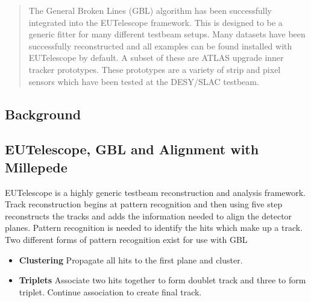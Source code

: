 \documentclass[a0,portrait]{a0poster}
\begin{document}
\vspace{1cm} %


\begin{multicols}{2} %


\begin{tcolorbox}
\color{Navy} %

\begin{abstract}
The General Broken Lines (GBL) algorithm has been successfully integrated into the EUTelescope framework. This is designed to be a generic fitter for many different testbeam setups. Many datasets have been successfully reconstructed and all examples can be found installed with EUTelescope by default. A subset of these are ATLAS upgrade inner tracker prototypes. These prototypes are a variety of strip and pixel sensors which have been tested at the DESY/SLAC testbeam. 


\end{abstract}
\end{tcolorbox}




\begin{tcolorbox}
\color{DarkSlateGray} %

\section*{Background}

\subsection*{EUTelescope, GBL and Alignment with Millepede}
EUTelescope is a highly generic testbeam reconstruction and analysis framework\cite{eutel}. Track reconstruction begins at pattern recognition and then using five step reconstructs the tracks and adds the information needed to align the detector planes. 
Pattern recognition is needed to identify the hits which make up a track. Two different forms of pattern recognition exist for use with GBL
\begin{itemize}
\item \textbf{Clustering} Propagate all hits to the first plane and cluster. 
\item \textbf{Triplets} Associate two hits together to form doublet track and three to form triplet. Continue association to create final track.
\end{itemize}


\end{tcolorbox}
\end{multicols}
\end{document}
